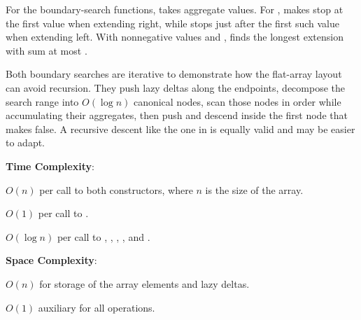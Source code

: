 For the boundary-search functions,  takes aggregate  values. For ,  makes  stop at the first value  when extending right, while  stops just after the first such value when extending left. With nonnegative values and ,  finds the longest extension with sum at most .

Both boundary searches are iterative to demonstrate how the flat-array layout can avoid recursion. They push lazy deltas along the endpoints, decompose the search range into $O(\log n)$ canonical nodes, scan those nodes in order while accumulating their aggregates, then push and descend inside the first node that makes  false. A recursive descent like the one in  is equally valid and may be easier to adapt.

\textbf{Time Complexity}:
\begin{compactitem}
  \item $O(n)$ per call to both constructors, where $n$ is the size of the array.
  \item $O(1)$ per call to .
  \item $O(\log n)$ per call to , , , , and .
\end{compactitem}

\textbf{Space Complexity}:
\begin{compactitem}
  \item $O(n)$ for storage of the array elements and lazy deltas.
  \item $O(1)$ auxiliary for all operations.
\end{compactitem}

